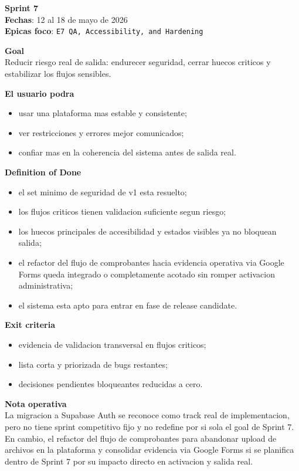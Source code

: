 \begin{docnote}
\textbf{Sprint 7}\\
\textbf{Fechas}: 12 al 18 de mayo de 2026\\
\textbf{Epicas foco}: \texttt{E7 QA, Accessibility, and Hardening}

\textbf{Goal}\\
Reducir riesgo real de salida: endurecer seguridad, cerrar huecos criticos y estabilizar los flujos sensibles.

\textbf{El usuario podra}\\
\begin{itemize}
  \item usar una plataforma mas estable y consistente;
  \item ver restricciones y errores mejor comunicados;
  \item confiar mas en la coherencia del sistema antes de salida real.
\end{itemize}

\textbf{Definition of Done}\\
\begin{itemize}
  \item el set minimo de seguridad de v1 esta resuelto;
  \item los flujos criticos tienen validacion suficiente segun riesgo;
  \item los huecos principales de accesibilidad y estados visibles ya no bloquean salida;
  \item el refactor del flujo de comprobantes hacia evidencia operativa via Google Forms queda integrado o completamente acotado sin romper activacion administrativa;
  \item el sistema esta apto para entrar en fase de release candidate.
\end{itemize}

\textbf{Exit criteria}\\
\begin{itemize}
  \item evidencia de validacion transversal en flujos criticos;
  \item lista corta y priorizada de bugs restantes;
  \item decisiones pendientes bloqueantes reducidas a cero.
\end{itemize}

\textbf{Nota operativa}\\
La migracion a Supabase Auth se reconoce como track real de implementacion, pero no tiene sprint competitivo fijo y no redefine por si sola el goal de Sprint 7. En cambio, el refactor del flujo de comprobantes para abandonar upload de archivos en la plataforma y consolidar evidencia via Google Forms si se planifica dentro de Sprint 7 por su impacto directo en activacion y salida real.
\end{docnote}

